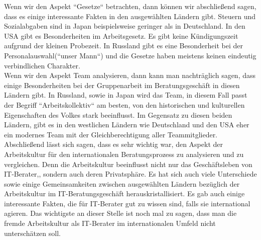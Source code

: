 Wenn wir den Aspekt ``Gesetze`` betrachten, dann können wir abschließend sagen, dass es einige interessante Fakten in den ausgewählten Ländern gibt. Steuern und Sozialabgaben sind in Japan beispielsweise geringer als in Deutschland. In den USA gibt es Besonderheiten im Arbeitsgesetz. Es gibt keine Kündigungszeit aufgrund der kleinen Probezeit. In Russland gibt es eine Besonderheit bei der Personalauswahl(``unser Mann``) und die Gesetze haben meistens keinen eindeutig verbindlichen Charakter.\\
Wenn wir den Aspekt Team analysieren, dann kann man nachträglich sagen, dass einige Besonderheiten bei der Gruppenarbeit im Beratungsgeschäft in diesen Ländern gibt. In Russland, sowie in Japan wird das Team, in diesem Fall passt der Begriff ``Arbeitskollektiv`` am besten, von den historischen und kulturellen Eigenschaften des Volkes stark beeinflusst. Im Gegensatz zu diesen beiden Ländern, gibt es in den westlichen Ländern wie Deutschland und den USA eher ein modernes Team mit der Gleichberechtigung aller Teammitglieder.\\
Abschließend lässt sich sagen, dass es sehr wichtig war, den Aspekt der Arbeitskultur für den internationalen Beratungsprozess zu analysieren und zu vergleichen. Denn die Arbeitskultur beeinflusst nicht nur das Geschäftsleben von IT-Berater,, sondern auch deren Privatsphäre. Es hat sich auch viele Unterschiede sowie einige Gemeinsamkeiten zwischen ausgewählten Ländern bezüglich der Arbeitskultur im IT-Beratungsgeschäft herauskristallisiert. Es gab auch einige interessante Fakten, die für IT-Berater gut zu wissen sind, falls sie international agieren. Das wichtigste an dieser Stelle ist noch mal zu sagen, dass man die fremde Arbeitskultur als IT-Berater im internationalen Umfeld nicht unterschätzen soll.







